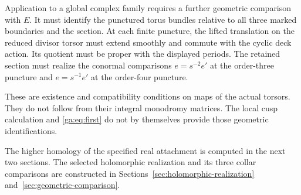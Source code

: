 Application to a global complex family requires a further geometric
comparison with $E$.
It must identify the punctured torus bundles relative to all three
marked boundaries and the section. At each finite puncture, the lifted translation on the reduced divisor
torsor must extend smoothly and commute with the cyclic deck action.
Its quotient must be proper with the displayed periods.
The retained section must realize the conormal comparisons
$e=s^{-2}e'$ at the order-three puncture and $e=s^{-1}e'$ at the order-four puncture.

These are existence and compatibility conditions on maps of the actual
torsors. They do not follow from their integral monodromy matrices.
The local cusp calculation and \eqref{ga:eq:first} do not by themselves
provide those geometric identifications.

The higher homology of the
specified real attachment is computed in the next two sections.
The selected holomorphic realization and its three collar comparisons
are constructed in Sections~\ref{sec:holomorphic-realization}
and~\ref{sec:geometric-comparison}.
